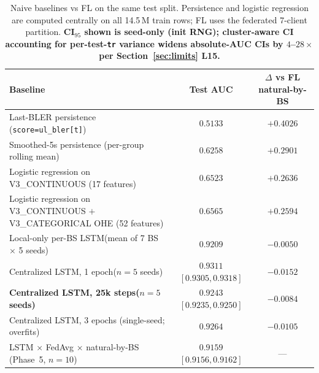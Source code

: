 \documentclass[journal]{IEEEtran}
\begin{document}
\begin{table}[t]
\caption{Naive baselines vs FL on the same test split. Persistence and logistic regression are computed centrally on all 14.5\,M train rows; FL uses the federated 7-client partition. \textbf{CI$_{95}$ shown is seed-only (init RNG); cluster-aware CI accounting for per-test-\lstinline|tr| variance widens absolute-AUC CIs by $4$--$28\times$ per Section~\ref{sec:limits} L15.}}
\label{tab:naive-baselines}
\centering
\begin{tabular}{@{}lcc@{}}
\toprule
Baseline & Test AUC & $\Delta$ vs FL natural-by-BS \\
\midrule
Last-BLER persistence (\lstinline|score=ul_bler[t]|) & $0.5133$ & $+0.4026$ \\
Smoothed-5s persistence (per-group rolling mean)    & $0.6258$ & $+0.2901$ \\
Logistic regression on V3\_CONTINUOUS (17 features) & $0.6523$ & $+0.2636$ \\
Logistic regression on V3\_CONTINUOUS $+$ V3\_CATEGORICAL OHE (52 features)\footnotemark[3] & $0.6565$ & $+0.2594$ \\
Local-only per-BS LSTM\footnotemark[4] (mean of 7 BS $\times$ 5 seeds) & $0.9209$ & $\mathbf{-0.0050}$ \\
Centralized LSTM, 1 epoch\footnotemark[1] ($n=5$ seeds)              & $0.9311$ \tiny{$[0.9305, 0.9318]$} & $-0.0152$ \\
\textbf{Centralized LSTM, 25k steps\footnotemark[2] ($n=5$ seeds)}   & $\mathbf{0.9243}$ \tiny{$[0.9235, 0.9250]$} & $\mathbf{-0.0084}$ \\
Centralized LSTM, 3 epochs (single-seed; overfits)                  & $0.9264$ & $-0.0105$ \\
LSTM $\times$ FedAvg $\times$ natural-by-BS (Phase~5, $n=10$)        & $0.9159$ \tiny{$[0.9156, 0.9162]$} & --- \\
\bottomrule
\end{tabular}


\end{table}
\end{document}
